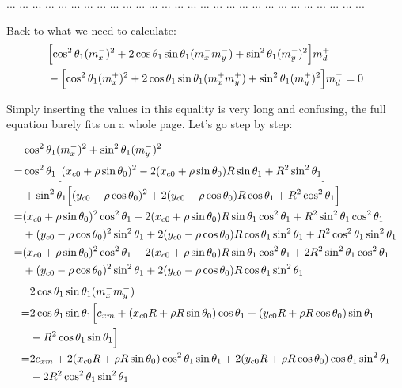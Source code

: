 \documentclass[12pt]{article}
\begin{document}
... ... ... ... ... ... ... ... ... ... ... ... ... ... ... ... ... ... ... ... ... ... ... ... ... ... ... ...

Back to what we need to calculate:
\begin{align}
    &\Bigl[\cos^2\theta_1(m_x^-)^2 + 2\cos\theta_1\sin\theta_1 (m_x^-m_y^-)  + \sin^2\theta_1(m_y^-)^2 \Bigr] m_d^+ \nonumber\\
    &- \Bigl[ \cos^2\theta_1(m_x^+)^2  + 2\cos\theta_1\sin\theta_1(m_x^+m_y^+)  +\sin^2\theta_1(m_y^+)^2 \Bigr] m_d^- = 0
\end{align}

Simply inserting the values in this equality is very long and confusing, the full equation barely fits on a whole page. Let's go step by step:

\begin{align}
    &\cos^2\theta_1(m_x^-)^2 + \sin^2\theta_1(m_y^-)^2\\
    =& \cos^2\theta_1 \Bigl[ (x_{c0}+\rho\sin\theta_0)^2 -2(x_{c0}+\rho\sin\theta_0)R\sin\theta_1  +R^2\sin^2\theta_1 \Bigr] \nonumber\\
    &+ \sin^2\theta_1\Bigl[ (y_{c0}- \rho\cos\theta_0)^2 + 2(y_{c0}- \rho\cos\theta_0)R\cos\theta_1  + R^2\cos^2\theta_1 \Bigr] \\
    =&  (x_{c0}+\rho\sin\theta_0)^2\cos^2\theta_1 -2(x_{c0}+\rho\sin\theta_0)R\sin\theta_1\cos^2\theta_1  +R^2\sin^2\theta_1\cos^2\theta_1 \nonumber\\
    &+  (y_{c0}- \rho\cos\theta_0)^2\sin^2\theta_1 + 2(y_{c0}- \rho\cos\theta_0)R\cos\theta_1\sin^2\theta_1  + R^2\cos^2\theta_1\sin^2\theta_1 \\
    =&  (x_{c0}+\rho\sin\theta_0)^2\cos^2\theta_1 -2(x_{c0}+\rho\sin\theta_0)R\sin\theta_1\cos^2\theta_1  +2R^2\sin^2\theta_1\cos^2\theta_1 \nonumber\\
    &+  (y_{c0}- \rho\cos\theta_0)^2\sin^2\theta_1 + 2(y_{c0}- \rho\cos\theta_0)R\cos\theta_1\sin^2\theta_1
\end{align}
\begin{align}
    & 2\cos\theta_1\sin\theta_1(m_x^-m_y^-) \\
    =& 2\cos\theta_1\sin\theta_1 \Bigl[ c_{xm} + (x_{c0}R + \rho R\sin\theta_0)\cos\theta_1 + (y_{c0}R + \rho R\cos\theta_0)\sin\theta_1 \nonumber\\
    &- R^2\cos\theta_1\sin\theta_1 \Bigr] \\
    =&  2c_{xm} + 2(x_{c0}R + \rho R\sin\theta_0)\cos^2\theta_1\sin\theta_1 + 2(y_{c0}R + \rho R\cos\theta_0)\cos\theta_1\sin^2\theta_1 \nonumber\\
    &- 2R^2\cos^2\theta_1\sin^2\theta_1
\end{align}
\end{document}
